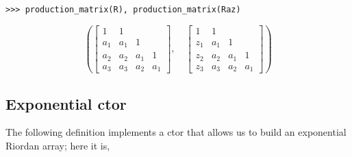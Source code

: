\begin{example}
\begin{verbatim}
>>> production_matrix(R), production_matrix(Raz)
\end{verbatim}
\begin{displaymath}
\left ( \left[\begin{matrix}1 & 1 &   &  \\a_{1} & a_{1} & 1 &  \\a_{2} & a_{2} & a_{1} & 1\\a_{3} & a_{3} & a_{2} & a_{1}\end{matrix}\right], \quad \left[\begin{matrix}1 & 1 &   &  \\z_{1} & a_{1} & 1 &  \\z_{2} & a_{2} & a_{1} & 1\\z_{3} & a_{3} & a_{2} & a_{1}\end{matrix}\right]\right )
\end{displaymath}
\end{example}

\subsection{Exponential ctor}

The following definition implements a ctor that allows us to build an
exponential Riordan array; here it is,


